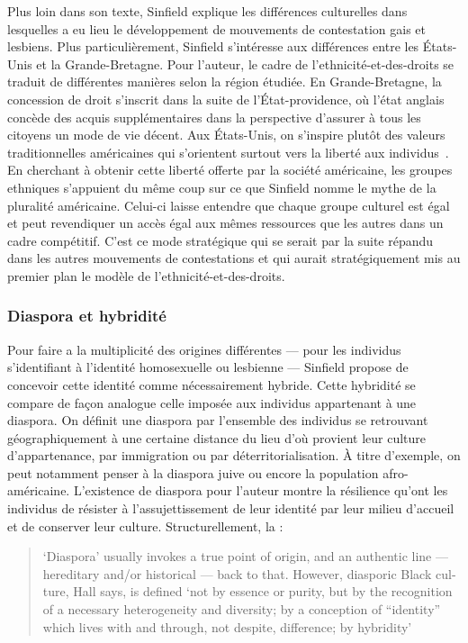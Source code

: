 Plus loin dans son texte, Sinfield explique les différences culturelles dans lesquelles a eu lieu le développement de mouvements de contestation gais et lesbiens. 
Plus particulièrement, Sinfield s'intéresse aux différences entre les États-Unis et la Grande-Bretagne. 
Pour l'auteur, le cadre de l'ethnicité-et-des-droits se traduit de différentes manières selon la région étudiée. 
En Grande-Bretagne, la concession de droit s'inscrit dans la suite de l'État-providence, où l'état anglais concède des acquis supplémentaires dans la perspective d'assurer à tous les citoyens un mode de vie décent. 
Aux États-Unis, on s'inspire plutôt des valeurs traditionnelles américaines qui s'orientent surtout vers la liberté aux individus~\citep[274]{Sinfield1996}. 
En cherchant à obtenir cette liberté offerte par la société américaine, les groupes ethniques s'appuient du même coup sur ce que Sinfield nomme le mythe de la pluralité américaine. 
Celui-ci laisse entendre que chaque groupe culturel est égal et peut revendiquer un accès égal aux mêmes ressources que les autres dans un cadre compétitif. 
C'est ce mode stratégique qui se serait par la suite répandu dans les autres mouvements de contestations et qui aurait stratégiquement mis au premier plan le modèle de l'ethnicité-et-des-droits.

\subsubsection{Diaspora et hybridité}
\label{sub:diaspora_et_hybridit_} Pour faire a la multiplicité des origines différentes --- pour les individus s'identifiant à l'identité homosexuelle ou lesbienne --- Sinfield propose de concevoir cette identité comme nécessairement hybride. 
Cette hybridité se compare de façon analogue celle imposée aux individus appartenant à une diaspora. 
On définit une diaspora par l'ensemble des individus se retrouvant géographiquement à une certaine distance du lieu d'où provient leur culture d'appartenance, par immigration ou par déterritorialisation. 
À titre d'exemple, on peut notamment penser à la diaspora juive ou encore la population afro-américaine.
L'existence de diaspora pour l'auteur montre la résilience qu'ont les individus de résister à l'assujettissement de leur identité par leur milieu d'accueil et de conserver leur culture. 
Structurellement, la : \foreignblockquote{english}[{\cite[278]{Sinfield1996}}][.]{`Diaspora' \textelp{}   usually invokes a true point of origin, and an authentic line --- hereditary   and/or historical --- back to that. However, diasporic Black culture, Hall says, is defined `not by essence or purity, but by the recognition of a necessary heterogeneity and diversity; by a conception of ``identity'' which lives with and through, not despite, difference; by hybridity'}

